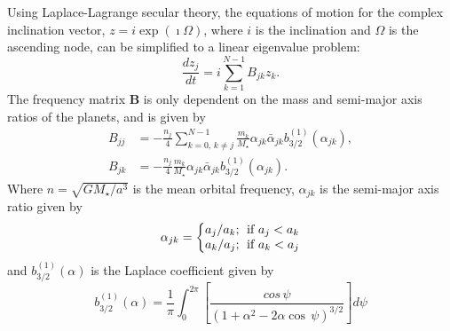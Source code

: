 \documentclass[11pt, oneside]{article}   	%
\begin{document}
Using Laplace-Lagrange secular theory, the equations of motion for the complex inclination vector, $z = i \exp(\imath \Omega)$, where $i$ is the inclination and $\Omega$ is the ascending node, can be simplified to a linear eigenvalue problem:
\begin{equation}
\frac{dz_{j}}{dt} = i \sum^{N-1}_{k=1} B_{jk} z_{k}.
\end{equation}
The frequency matrix \textbf{B} is only dependent on the mass and semi-major axis ratios of the planets, and is given by
\begin{subequations}
\begin{align}
   B_{jj} &= -\frac{n_j}{4} \sum ^{N-1}_{k=0,\, k \neq j}\frac{m_k}{M_{\star}}\alpha _{jk} \bar{\alpha}_{jk}b^{(1)}_{3/2}(\alpha _{jk}),\\
   B_{jk} &= -\frac{n_j}{4} \frac{m_k}{M_{\star}}\alpha _{jk} \bar{\alpha}_{jk}b^{(1)}_{3/2}(\alpha _{jk}).
\end{align}
\end{subequations}
Where $n = \sqrt{GM_{\star}/a^{3}}$ is the mean orbital frequency, $\alpha_{jk}$ is the semi-major axis ratio given by
\begin{equation}
\alpha _{jk} = \left\{\begin{matrix}
a_j/a_k \text{;\hspace*{0.1cm} if } a_j < a_k\\ 
a_k/a_j  \text{;\hspace*{0.1cm} if } a_k < a_j
\end{matrix}\right.
\end{equation}
and $b^{(1)}_{3/2} (\alpha)$ is the Laplace coefficient given by
\begin{equation}
b^{(1)}_{3/2} (\alpha) = \frac{1}{\pi}\int_{0}^{2\pi}\left [ \frac{cos\, \psi}{(1+\alpha^{2} - 2\alpha \cos\, \psi)^{3/2}} \right]d\psi
\end{equation}
\end{document}
